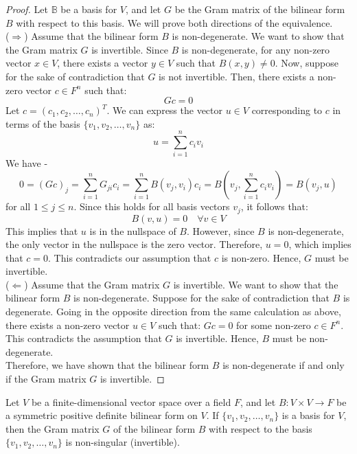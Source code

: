 \documentclass[openany]{book}
\begin{document}
\begin{proof}
    Let $\mathbb{B}$ be a basis for $V$, and let $G$ be the Gram matrix of the bilinear form $B$ with respect to this basis. We will prove both directions of the equivalence. \\
    ($\Rightarrow$) Assume that the bilinear form $B$ is non-degenerate. We want to show that the Gram matrix $G$ is invertible. Since $B$ is non-degenerate, for any non-zero vector $x \in V$, there exists a vector $y \in V$ such that $B(x, y) \neq 0$. Now, suppose for the sake of contradiction that $G$ is not invertible. Then, there exists a non-zero vector $c \in F^n$ such that:
    $$G c = 0$$
    Let $c = (c_1, c_2, \ldots, c_n)^T$. We can express the vector $u \in V$ corresponding to $c$ in terms of the basis $\{v_1, v_2, \ldots, v_n\}$ as:
    $$u = \sum_{i=1}^n c_i v_i$$
    We have - 
    $$0 = (Gc)_j = \sum_{i=1}^n G_{ji} c_i = \sum_{i=1}^n B(v_j, v_i) c_i = B\left(v_j, \sum_{i=1}^n c_i v_i\right) = B(v_j, u)$$
    for all $1 \leq j \leq n$. Since this holds for all basis vectors $v_j$, it follows that:
    $$B(v, u) = 0 \quad \forall v \in V$$
    This implies that $u$ is in the nullspace of $B$. However, since $B$ is non-degenerate, the only vector in the nullspace is the zero vector. Therefore, $u = 0$, which implies that $c = 0$. This contradicts our assumption that $c$ is non-zero. Hence, $G$ must be invertible. \\
    ($\Leftarrow$) Assume that the Gram matrix $G$ is invertible. We want to show that the bilinear form $B$ is non-degenerate. Suppose for the sake of contradiction that $B$ is degenerate. Going in the opposite direction from the same calculation as above, there exists a non-zero vector $u \in V$ such that:
    $G c = 0$ for some non-zero $c \in F^n$. This contradicts the assumption that $G$ is invertible. Hence, $B$ must be non-degenerate. \\
    Therefore, we have shown that the bilinear form $B$ is non-degenerate if and only if the Gram matrix $G$ is invertible.
\end{proof}
\begin{mytheorem}
Let $V$ be a finite-dimensional vector space over a field $F$, and let $B: V \times V \to F$ be a symmetric positive definite bilinear form on $V$. If $\{v_1, v_2, \ldots, v_n\}$ is a basis for $V$, then the Gram matrix $G$ of the bilinear form $B$ with respect to the basis $\{v_1, v_2, \ldots, v_n\}$ is non-singular (invertible).
\end{mytheorem}
\end{document}
